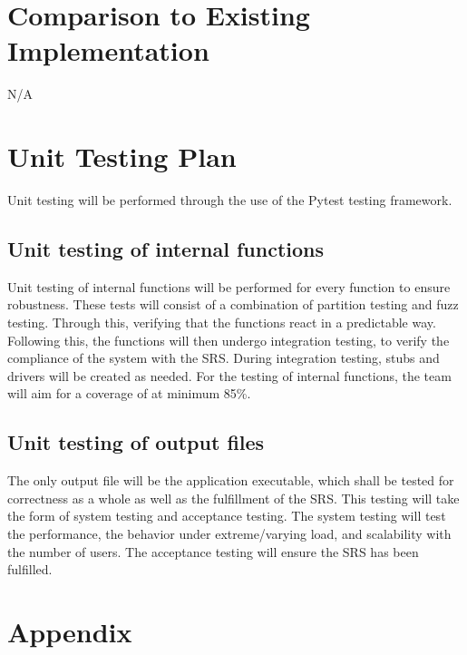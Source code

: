 \documentclass[12pt, titlepage]{article}
\begin{document}
\section{Comparison to Existing Implementation}
N/A

\section{Unit Testing Plan}
Unit testing will be performed through the use of the Pytest testing framework.

\subsection{Unit testing of internal functions}
Unit testing of internal functions will be performed for every function to ensure robustness. These tests will consist of a combination of partition testing and fuzz testing. Through this, verifying that the functions react in a predictable way. Following this, the functions will then undergo integration testing, to verify the compliance of the system with the SRS. During integration testing, stubs and drivers will be created as needed. For the testing of internal functions, the team will aim for a coverage of at minimum 85\%.

\subsection{Unit testing of output files}		
The only output file will be the application executable, which shall be tested for correctness as a whole as well as the fulfillment of the SRS. This testing will take the form of system testing and acceptance testing. The system testing will test the performance, the behavior under extreme/varying load, and scalability with the number of users. The acceptance testing will ensure the SRS has been fulfilled.



\newpage

\section{Appendix}

\end{document}
